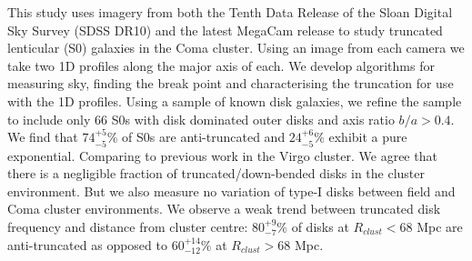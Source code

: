 
This study uses \iband imagery from both the Tenth Data Release of the Sloan Digital Sky Survey (SDSS DR10) and the latest MegaCam release to study truncated lenticular (S0) galaxies in the Coma cluster. Using an image from each camera we take two 1D profiles along the major axis of each. We develop algorithms for measuring sky, finding the break point and characterising the truncation for use with the 1D profiles. Using a sample of known disk galaxies, we refine the sample to include only 66 S0s with disk dominated outer disks and axis ratio $b/a > 0.4$. We find that $74^{+5}_{-5}\%$ of S0s are anti-truncated and $24^{+6}_{-5}\%$ exhibit a pure exponential. Comparing to previous work in the Virgo cluster. We agree that there is a negligible fraction of truncated/down-bended disks in the cluster environment. But we also measure no variation of type-I disks between field and Coma cluster environments. We observe a weak trend between truncated disk frequency and distance from cluster centre: $80^{+9}_{-7}\%$ of disks at $R_{clust} < 68$ Mpc are anti-truncated as opposed to $60^{+14}_{-12}\%$ at $R_{clust} > 68$ Mpc.
